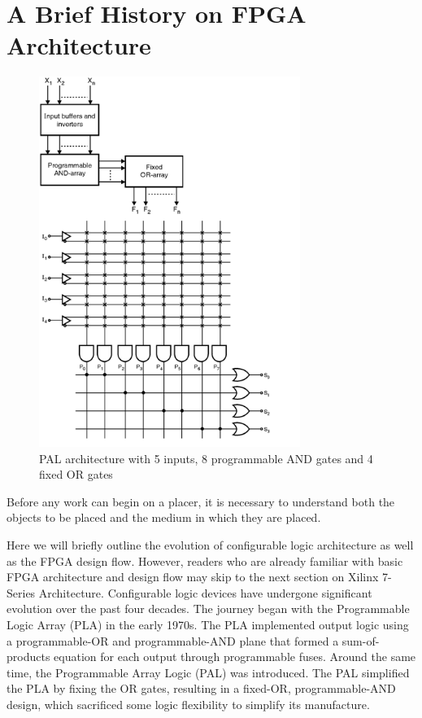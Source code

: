 \documentclass[twocolumn]{article}
\begin{document}
\section{A Brief History on FPGA Architecture}

    \begin{figure}
        \centering
        \includegraphics[width=8.5cm]{figures/pal_2.png}
        \caption{PAL architecture with 5 inputs, 8 programmable AND gates and 4 fixed OR gates}
        \label{fig:pla}
    \end{figure}

    Before any work can begin on a placer, it is necessary to understand both the objects to be placed and the medium in which they are placed.

    Here we will briefly outline the evolution of configurable logic architecture as well as the FPGA design flow. 
    However, readers who are already familiar with basic FPGA architecture and design flow may skip to the next section on Xilinx 7-Series Architecture. 
    Configurable logic devices have undergone significant evolution over the past four decades. 
    The journey began with the Programmable Logic Array (PLA) in the early 1970s. 
    The PLA implemented output logic using a programmable-OR and programmable-AND plane that formed a sum-of-products equation for each output through programmable fuses. 
    Around the same time, the Programmable Array Logic (PAL) was introduced. 
    The PAL simplified the PLA by fixing the OR gates, resulting in a fixed-OR, programmable-AND design, which sacrificed some logic flexibility to simplify its manufacture.
\end{document}
